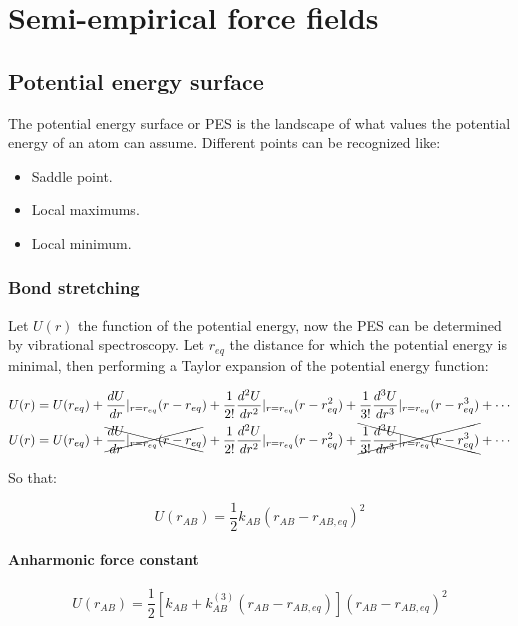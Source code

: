 \chapter{Semi-empirical force fields}

\section{Potential energy surface}
The potential energy surface or PES is the landscape of what values the potential energy of an atom can assume.
Different points can be recognized like:

\begin{multicols}{2}
	\begin{itemize}
		\item Saddle point.
		\item Local maximums.
		\item Local minimum.
	\end{itemize}
\end{multicols}

	\subsection{Bond stretching}
	Let $U(r)$ the function of the potential energy, now the PES can be determined by vibrational spectroscopy.
	Let $r_{eq}$ the distance for which the potential energy is minimal, then performing a Taylor expansion of the potential energy function:

	\begin{align*}
		U(r)&=U(r_{eq}) + \frac{dU}{dr}|_{r=r_{eq}}(r-r_{eq})+\frac{1}{2!}\frac{d^2U}{dr^2}|_{r=r_{eq}}(r-r_{eq}^2)+\frac{1}{3!}\frac{d^3U}{dr^3}|_{r=r_{eq}}(r-r_{eq}^3)+\cdots\\
		U(r)&=U(r_{eq}) + \xcancel{\frac{dU}{dr}|_{r=r_{eq}}(r-r_{eq}})+\frac{1}{2!}\frac{d^2U}{dr^2}|_{r=r_{eq}}(r-r_{eq}^2)+\xcancel{\frac{1}{3!}\frac{d^3U}{dr^3}|_{r=r_{eq}}(r-r_{eq}^3)}+\cdots\\
	\end{align*}

	So that:

	$$U(r_{AB}) = \frac{1}{2}k_{AB}(r_{AB}-r_{AB,eq})^2$$


		\subsubsection{Anharmonic force constant}

		$$U(r_{AB}) = \frac{1}{2}[k_{AB}+k^{(3)}_{AB}(r_{AB}-r_{AB, eq})](r_{AB}-r_{AB, eq})^2$$

